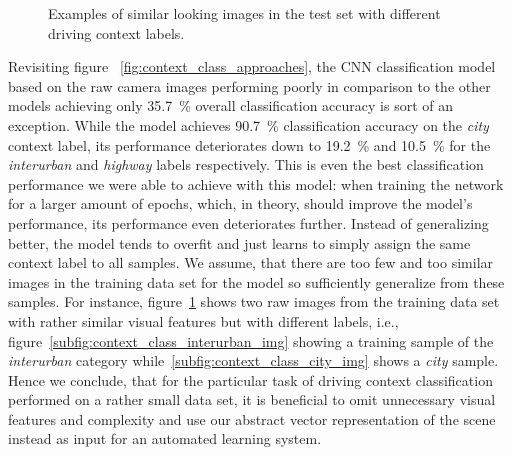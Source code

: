 \begin{figure}[t]
    \centering
    \caption{Examples of similar looking images in the test set with different driving context labels. }
    \label{fig:context_class_similar_image_examples}
\end{figure}

Revisiting figure ~\ref{fig:context_class_approaches}, the \ac{CNN} classification model based on the raw camera images performing poorly in comparison to the other models achieving only \SI{35.7}{\percent} overall classification accuracy is sort of an exception.
While the model achieves \SI{90.7}{\percent} classification accuracy on the \emph{city} context label, its performance deteriorates down to \SI{19.2}{\percent} and \SI{10.5}{\percent} for the \emph{interurban} and \emph{highway} labels respectively.
This is even the best classification performance we were able to achieve with this model: when training the network for a larger amount of epochs, which, in theory, should improve the model's performance, its performance even deteriorates further.
Instead of generalizing better, the model tends to overfit and just learns to simply assign the same context label to all samples.
We assume, that there are too few and too similar images in the training data set for the model so sufficiently generalize from these samples.
For instance, figure~\ref{fig:context_class_similar_image_examples} shows two raw images from the training data set with rather similar visual features but with different labels, i.e., figure~\ref{subfig:context_class_interurban_img} showing a training sample of the \emph{interurban} category while~\ref{subfig:context_class_city_img} shows a \emph{city} sample.
Hence we conclude, that for the particular task of driving context classification performed on a rather small data set, it is beneficial to omit unnecessary visual features and complexity and use our abstract vector representation of the scene instead as input for an automated learning system.


